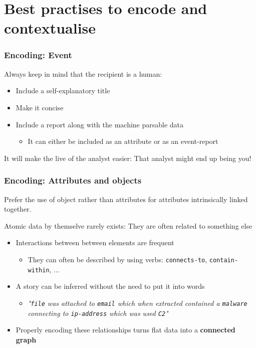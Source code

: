 \section{Best practises to encode and contextualise}
\begin{frame}
    \frametitle{Encoding: Event}
    Always keep in mind that the recipient is a human:
    \begin{itemize}
        \item Include a self-explanatory title
        \item Make it concise
        \item Include a report along with the machine parsable data
        \begin{itemize}
            \item It can either be included as an attribute or as an event-report
        \end{itemize}
    \end{itemize}
    It will make the live of the analyst easier: That analyst might end up being you!
\end{frame}

\begin{frame}
    \frametitle{Encoding: Attributes and objects}
    Prefer the use of object rather than attributes for attributes intrinsically linked together.

    \vspace{12px}
    Atomic data by themselve rarely exists: They are often related to something else
    \begin{itemize}
        \item Interactions between between elements are frequent
        \begin{itemize}
            \item They can often be described by using verbs: \texttt{connects-to}, \texttt{contain-within}, ...
        \end{itemize}
        \item A story can be inferred without the need to put it into words
        \begin{itemize}
            \item \textit{"\texttt{file} was attached to \texttt{email} which when extracted contained a \texttt{malware} connecting to \texttt{ip-address} which was used \texttt{C2}"}
        \end{itemize}
        \item Properly encoding these relationships turns flat data into a \textbf{connected graph}
    \end{itemize}
\end{frame}

